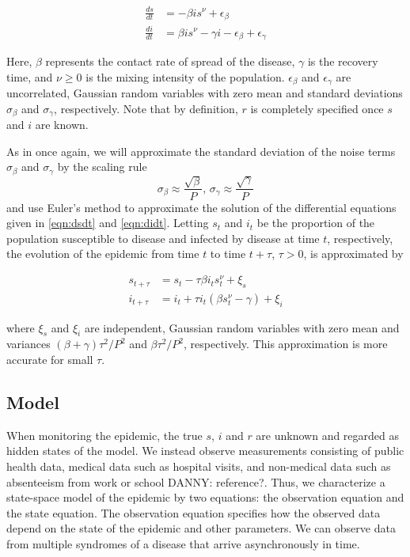 \documentclass{article}
\newcommand{\danny}[1]{{\color{blue}DANNY: #1}}
\begin{document}
\begin{align}
\frac{ds}{dt} &= -\beta is^\nu + \epsilon_\beta \label{eqn:dsdt} \\
\frac{di}{dt} &= \beta is^\nu - \gamma i - \epsilon_\beta + \epsilon_\gamma \label{eqn:didt}
\end{align}

\noindent Here, $\beta$ represents the contact rate of spread of the disease, $\gamma$ is the recovery time, and $\nu \ge 0$ is the mixing intensity of the population.  $\epsilon_\beta$ and $\epsilon_\gamma$ are uncorrelated, Gaussian random variables with zero mean and standard deviations $\sigma_\beta$ and $\sigma_\gamma$, respectively.  Note that by definition, $r$ is completely specified once $s$ and $i$ are known.

As in \citet{skvortsov2012monitoring} once again, we will approximate the standard deviation of the noise terms $\sigma_\beta$ and $\sigma_\gamma$ by the scaling rule \[\sigma_\beta \approx \frac{\sqrt{\beta}}{P} \mbox{, } \sigma_\gamma \approx \frac{\sqrt{\gamma}}{P}\] and use Euler's method to approximate the solution of the differential equations given in \eqref{eqn:dsdt} and \eqref{eqn:didt}.  Letting $s_t$ and $i_t$ be the proportion of the population susceptible to disease and infected by disease at time $t$, respectively, the evolution of the epidemic from time $t$ to time $t + \tau$, $\tau > 0$, is approximated by

\begin{align}
s_{t+\tau} &= s_t - \tau\beta i_ts^\nu_t + \xi_s \label{eqn:s} \\
i_{t+\tau} &= i_t + \tau i_t(\beta s^\nu_t - \gamma) + \xi_i \label{eqn:i}
\end{align}

\noindent where $\xi_s$ and $\xi_i$ are independent, Gaussian random variables with zero mean and variances $(\beta + \gamma)\tau^2/P^2$ and $\beta\tau^2/P^2$, respectively.  This approximation is more accurate for small $\tau$.

\subsection{Model}

When monitoring the epidemic, the true $s$, $i$ and $r$ are unknown and regarded as hidden states of the model.  We instead observe measurements consisting of public health data, medical data such as hospital visits, and non-medical data such as absenteeism from work or school \danny{reference?}.  Thus, we characterize a state-space model of the epidemic by two equations: the observation equation and the state equation.  The observation equation specifies how the observed data depend on the state of the epidemic and other parameters.  We can observe data from multiple syndromes of a disease that arrive asynchronously in time.
\end{document}
